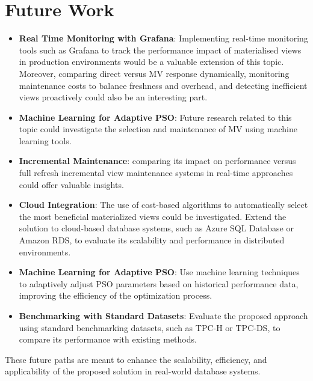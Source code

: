 \section{Future Work}
\begin{itemize}

    \item \textbf{Real Time Monitoring with Grafana}: Implementing real-time monitoring tools such as Grafana to track the performance impact of materialised views in production environments would be a valuable extension of this topic. Moreover, comparing direct versus MV response dynamically, monitoring maintenance costs to balance freshness and overhead, and detecting inefficient views proactively could also be an interesting part.
       
    \item \textbf{Machine Learning for Adaptive PSO}: Future research related to this topic could investigate the selection and maintenance of MV using machine learning tools.
    
    \item \textbf{Incremental Maintenance}: comparing its impact on performance versus full refresh incremental view maintenance systems in real-time approaches could offer valuable insights.
    
    \item \textbf{Cloud Integration}: The use of cost-based algorithms to automatically select the most beneficial materialized views could be investigated. Extend the solution to cloud-based database systems, such as Azure SQL Database or Amazon RDS, to evaluate its scalability and performance in distributed environments.
    
    \item \textbf{Machine Learning for Adaptive PSO}: Use machine learning techniques to adaptively adjust PSO parameters based on historical performance data, improving the efficiency of the optimization process.
    
    \item \textbf{Benchmarking with Standard Datasets}: Evaluate the proposed approach using standard benchmarking datasets, such as TPC-H or TPC-DS, to compare its performance with existing methods.
\end{itemize}

These future paths are meant to enhance the scalability, efficiency, and applicability of the proposed solution in real-world database systems.\\
